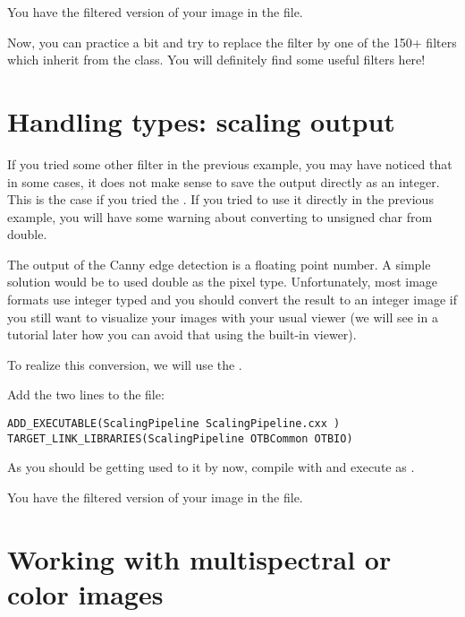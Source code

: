 You have the filtered version of your image in the  file.

Now, you can practice a bit and try to replace the filter by one of the 150+
filters which inherit from the  class. You
will definitely find some useful filters here!

\section{Handling types: scaling output}
\label{sec:TutorialScaling}

If you tried some other filter in the previous example, you may have noticed
that in some cases, it does not make sense to save the output directly as an
integer. This is the case if you tried the
. If you tried to use it directly in
the previous example, you will have some warning about converting to unsigned
char from double.

The output of the Canny edge detection is a floating point number. A simple
solution would be to used double as the pixel type. Unfortunately, most image
formats use integer typed and you should convert the result to an integer image if you
still want to visualize your images with your usual viewer (we will see in a
tutorial later how you can avoid that using the built-in viewer).

To realize this conversion, we will use the
.

Add the two lines to the  file:

\begin{small}
\begin{verbatim}
ADD_EXECUTABLE(ScalingPipeline ScalingPipeline.cxx )
TARGET_LINK_LIBRARIES(ScalingPipeline OTBCommon OTBIO)
\end{verbatim}
\end{small}



As you should be getting used to it by now, compile with  and execute
as .

You have the filtered version of your image in the  file.

\section{Working with multispectral or color images}

